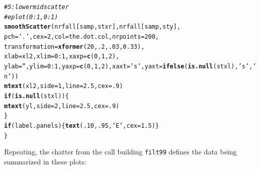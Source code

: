 \documentclass{article}\usepackage[]{graphicx}\usepackage[]{color}
\makeatletter
\newcommand{\hlnum}[1]{\textcolor[rgb]{0.686,0.059,0.569}{#1}}%
\newcommand{\hlstr}[1]{\textcolor[rgb]{0.192,0.494,0.8}{#1}}%
\newcommand{\hlcom}[1]{\textcolor[rgb]{0.678,0.584,0.686}{\textit{#1}}}%
\newcommand{\hlopt}[1]{\textcolor[rgb]{0,0,0}{#1}}%
\newcommand{\hlstd}[1]{\textcolor[rgb]{0.345,0.345,0.345}{#1}}%
\newcommand{\hlkwa}[1]{\textcolor[rgb]{0.161,0.373,0.58}{\textbf{#1}}}%
\newcommand{\hlkwc}[1]{\textcolor[rgb]{0.333,0.667,0.333}{#1}}%
\newcommand{\hlkwd}[1]{\textcolor[rgb]{0.737,0.353,0.396}{\textbf{#1}}}%
\newenvironment{kframe}{%
 \def\at@end@of@kframe{}%
 \ifinner\ifhmode%
  \def\at@end@of@kframe{\end{minipage}}%
  \begin{minipage}{\columnwidth}%
 \fi\fi%
 \def\FrameCommand##1{\hskip\@totalleftmargin \hskip-\fboxsep
 \colorbox{shadecolor}{##1}\hskip-\fboxsep
     \hskip-\linewidth \hskip-\@totalleftmargin \hskip\columnwidth}%
 \MakeFramed {\advance\hsize-\width
   \@totalleftmargin\z@ \linewidth\hsize
   \@setminipage}}%
 {\par\unskip\endMakeFramed%
 \at@end@of@kframe}
\newenvironment{knitrout}{}{} %
\makeatother
\begin{document}
\begin{knitrout}
\begin{kframe}
\begin{alltt}
  \hlcom{# 5: lower mid scatter}
  \hlcom{#eplot(0:1,0:1)}
  \hlkwd{smoothScatter}\hlstd{(nrfall[samp,stxr], nrfall[samp,sty],}
                \hlkwc{pch}\hlstd{=}\hlstr{'.'}\hlstd{,} \hlkwc{cex}\hlstd{=}\hlnum{2}\hlstd{,} \hlkwc{col}\hlstd{=the.dot.col,} \hlkwc{nrpoints}\hlstd{=}\hlnum{200}\hlstd{,}
                \hlkwc{transformation}\hlstd{=}\hlkwd{xformer}\hlstd{(}\hlnum{20}\hlstd{,}\hlnum{.2}\hlstd{,}\hlnum{.03}\hlstd{,}\hlnum{0.33}\hlstd{),}
                \hlkwc{xlab}\hlstd{=xl2,} \hlkwc{xlim}\hlstd{=}\hlnum{0}\hlopt{:}\hlnum{1}\hlstd{,} \hlkwc{xaxp}\hlstd{=}\hlkwd{c}\hlstd{(}\hlnum{0}\hlstd{,}\hlnum{1}\hlstd{,}\hlnum{2}\hlstd{),}
                \hlkwc{ylab}\hlstd{=}\hlstr{''}\hlstd{,}  \hlkwc{ylim}\hlstd{=}\hlnum{0}\hlopt{:}\hlnum{1}\hlstd{,} \hlkwc{yaxp}\hlstd{=}\hlkwd{c}\hlstd{(}\hlnum{0}\hlstd{,}\hlnum{1}\hlstd{,}\hlnum{2}\hlstd{),}\hlkwc{xaxt}\hlstd{=}\hlstr{'s'}\hlstd{,}\hlkwc{yaxt}\hlstd{=}\hlkwd{ifelse}\hlstd{(}\hlkwd{is.null}\hlstd{(stxl),}\hlstr{'s'}\hlstd{,}\hlstr{'n'}\hlstd{))}
  \hlkwd{mtext}\hlstd{(xl2,} \hlkwc{side}\hlstd{=}\hlnum{1}\hlstd{,} \hlkwc{line}\hlstd{=}\hlnum{2.5}\hlstd{,} \hlkwc{cex}\hlstd{=}\hlnum{.9}\hlstd{)}
  \hlkwa{if}\hlstd{(}\hlkwd{is.null}\hlstd{(stxl))\{}
    \hlkwd{mtext}\hlstd{(yl,} \hlkwc{side}\hlstd{=}\hlnum{2}\hlstd{,} \hlkwc{line}\hlstd{=}\hlnum{2.5}\hlstd{,} \hlkwc{cex}\hlstd{=}\hlnum{.9}\hlstd{)}
  \hlstd{\}}
  \hlkwa{if}\hlstd{(label.panels)\{}\hlkwd{text}\hlstd{(}\hlnum{.10}\hlstd{,} \hlnum{.95}\hlstd{,} \hlstr{'E'}\hlstd{,} \hlkwc{cex}\hlstd{=}\hlnum{1.5}\hlstd{)\}}
\hlstd{\}}
\end{alltt}
\end{kframe}
\end{knitrout}

Repeating, the chatter from the call building \texttt{filt99} defines the data being summarized in these plots:
\end{document}
